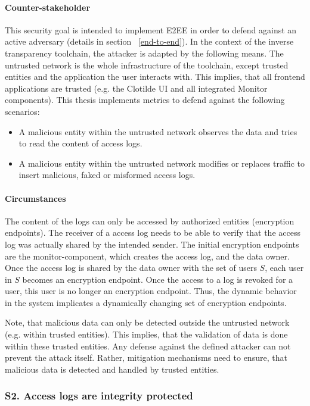 \documentclass[../main.tex]{subfiles}
\begin{document}
\paragraph{Counter-stakeholder}
This security goal is intended to implement E2EE in order to defend against an active adversary (details in section ~\ref{end-to-end}).
In the context of the inverse transparency toolchain, the attacker is adapted by the following means. 
The untrusted network is the whole infrastructure of the toolchain, except trusted entities and the application the user interacts with.
This implies, that all frontend applications are trusted (e.g. the Clotilde UI and all integrated Monitor components).
This thesis implements metrics to defend against the following scenarios:
\begin{itemize}
    \item A malicious entity within the untrusted network observes the data and tries to read the content of access logs.
    \item A malicious entity within the untrusted network modifies or replaces traffic to insert malicious, faked or misformed access logs.
\end{itemize}

\paragraph{Circumstances}
The content of the logs can only be accessed by authorized entities (encryption endpoints).
The receiver of a access log needs to be able to verify that the access log was actually shared by the intended sender. 
The initial encryption endpoints are the monitor-component, which creates the access log, and the data owner.
Once the access log is shared by the data owner with the set of users $S$, each user in $S$ becomes an encryption endpoint.
Once the access to a log is revoked for a user, this user is no longer an encryption endpoint.
Thus, the dynamic behavior in the system implicates a dynamically changing set of encryption endpoints.

Note, that malicious data can only be detected outside the untrusted network (e.g. within trusted entities).
This implies, that the validation of data is done within these trusted entities. 
Any defense against the defined attacker can not prevent the attack itself.
Rather, mitigation mechanisms need to ensure, that malicious data is detected and handled by trusted entities.

\subsubsection{S2. Access logs are integrity protected}
\end{document}
